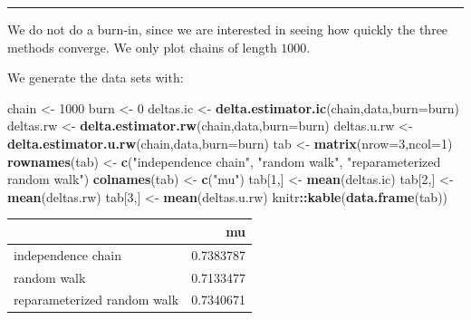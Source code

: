 \documentclass[
  11pt,
]{paper}
\newenvironment{Shaded}{\begin{snugshade}}{\end{snugshade}}
\newcommand{\AttributeTok}[1]{\textcolor[rgb]{0.13,0.29,0.53}{#1}}
\newcommand{\DecValTok}[1]{\textcolor[rgb]{0.00,0.00,0.81}{#1}}
\newcommand{\FunctionTok}[1]{\textcolor[rgb]{0.13,0.29,0.53}{\textbf{#1}}}
\newcommand{\NormalTok}[1]{#1}
\newcommand{\OtherTok}[1]{\textcolor[rgb]{0.56,0.35,0.01}{#1}}
\newcommand{\SpecialCharTok}[1]{\textcolor[rgb]{0.81,0.36,0.00}{\textbf{#1}}}
\newcommand{\StringTok}[1]{\textcolor[rgb]{0.31,0.60,0.02}{#1}}
\begin{document}
\begin{center}\rule{0.5\linewidth}{0.5pt}\end{center}

We do not do a burn-in, since we are interested in seeing how quickly
the three methods converge. We only plot chains of length \(1000\).

We generate the data sets with:

\begin{Shaded}
\begin{Highlighting}[]
\NormalTok{chain }\OtherTok{\textless{}{-}} \DecValTok{1000}
\NormalTok{burn }\OtherTok{\textless{}{-}} \DecValTok{0}
\NormalTok{deltas.ic }\OtherTok{\textless{}{-}} \FunctionTok{delta.estimator.ic}\NormalTok{(chain,data,}\AttributeTok{burn=}\NormalTok{burn)}
\NormalTok{deltas.rw }\OtherTok{\textless{}{-}} \FunctionTok{delta.estimator.rw}\NormalTok{(chain,data,}\AttributeTok{burn=}\NormalTok{burn)}
\NormalTok{deltas.u.rw }\OtherTok{\textless{}{-}} \FunctionTok{delta.estimator.u.rw}\NormalTok{(chain,data,}\AttributeTok{burn=}\NormalTok{burn)}
\NormalTok{tab }\OtherTok{\textless{}{-}} \FunctionTok{matrix}\NormalTok{(}\AttributeTok{nrow=}\DecValTok{3}\NormalTok{,}\AttributeTok{ncol=}\DecValTok{1}\NormalTok{)}
\FunctionTok{rownames}\NormalTok{(tab) }\OtherTok{\textless{}{-}} \FunctionTok{c}\NormalTok{(}\StringTok{"independence chain"}\NormalTok{,}
                   \StringTok{"random walk"}\NormalTok{,}
                   \StringTok{"reparameterized random walk"}\NormalTok{)}
\FunctionTok{colnames}\NormalTok{(tab) }\OtherTok{\textless{}{-}} \FunctionTok{c}\NormalTok{(}\StringTok{"mu"}\NormalTok{)}
\NormalTok{tab[}\DecValTok{1}\NormalTok{,] }\OtherTok{\textless{}{-}} \FunctionTok{mean}\NormalTok{(deltas.ic)}
\NormalTok{tab[}\DecValTok{2}\NormalTok{,] }\OtherTok{\textless{}{-}} \FunctionTok{mean}\NormalTok{(deltas.rw)}
\NormalTok{tab[}\DecValTok{3}\NormalTok{,] }\OtherTok{\textless{}{-}} \FunctionTok{mean}\NormalTok{(deltas.u.rw)}
\NormalTok{knitr}\SpecialCharTok{::}\FunctionTok{kable}\NormalTok{(}\FunctionTok{data.frame}\NormalTok{(tab))}
\end{Highlighting}
\end{Shaded}

\begin{longtable}[]{@{}lr@{}}
\toprule\noalign{}
& mu \\
\midrule\noalign{}
\endhead
\bottomrule\noalign{}
\endlastfoot
independence chain & 0.7383787 \\
random walk & 0.7133477 \\
reparameterized random walk & 0.7340671 \\
\end{longtable}
\end{document}
